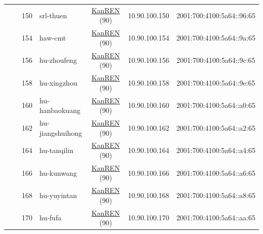 \begin{small}
\begin{center}
\begin{longtable}{|c|c|c|c|c|c|c|c|}
  &  & \tiny{150} & \multicolumn{1}{|l|}{\tiny{srl-thuen}} & \multicolumn{2}{|c|}{\tiny{\href{http://www.kanren.net}{KanREN} (90)}} & \tiny{10.90.100.150} & \tiny{2001:700:4100:5a64::96:65} \\* \cline{3-3}\cline{4-4}\cline{5-5}\cline{6-6}\cline{7-7}\cline{8-8}
  &  & \tiny{154} & \multicolumn{1}{|l|}{\tiny{haw-cmt}} & \multicolumn{2}{|c|}{\tiny{\href{http://www.kanren.net}{KanREN} (90)}} & \tiny{10.90.100.154} & \tiny{2001:700:4100:5a64::9a:65} \\* \cline{3-3}\cline{4-4}\cline{5-5}\cline{6-6}\cline{7-7}\cline{8-8}
  &  & \tiny{156} & \multicolumn{1}{|l|}{\tiny{hu-zhoufeng}} & \multicolumn{2}{|c|}{\tiny{\href{http://www.kanren.net}{KanREN} (90)}} & \tiny{10.90.100.156} & \tiny{2001:700:4100:5a64::9c:65} \\* \cline{3-3}\cline{4-4}\cline{5-5}\cline{6-6}\cline{7-7}\cline{8-8}
  &  & \tiny{158} & \multicolumn{1}{|l|}{\tiny{hu-xingzhou}} & \multicolumn{2}{|c|}{\tiny{\href{http://www.kanren.net}{KanREN} (90)}} & \tiny{10.90.100.158} & \tiny{2001:700:4100:5a64::9e:65} \\* \cline{3-3}\cline{4-4}\cline{5-5}\cline{6-6}\cline{7-7}\cline{8-8}
  &  & \tiny{160} & \multicolumn{1}{|l|}{\tiny{hu-hanbaokuang}} & \multicolumn{2}{|c|}{\tiny{\href{http://www.kanren.net}{KanREN} (90)}} & \tiny{10.90.100.160} & \tiny{2001:700:4100:5a64::a0:65} \\* \cline{3-3}\cline{4-4}\cline{5-5}\cline{6-6}\cline{7-7}\cline{8-8}
  &  & \tiny{162} & \multicolumn{1}{|l|}{\tiny{hu-jiangshuihong}} & \multicolumn{2}{|c|}{\tiny{\href{http://www.kanren.net}{KanREN} (90)}} & \tiny{10.90.100.162} & \tiny{2001:700:4100:5a64::a2:65} \\* \cline{3-3}\cline{4-4}\cline{5-5}\cline{6-6}\cline{7-7}\cline{8-8}
  &  & \tiny{164} & \multicolumn{1}{|l|}{\tiny{hu-tanqilin}} & \multicolumn{2}{|c|}{\tiny{\href{http://www.kanren.net}{KanREN} (90)}} & \tiny{10.90.100.164} & \tiny{2001:700:4100:5a64::a4:65} \\* \cline{3-3}\cline{4-4}\cline{5-5}\cline{6-6}\cline{7-7}\cline{8-8}
  &  & \tiny{166} & \multicolumn{1}{|l|}{\tiny{hu-kunwang}} & \multicolumn{2}{|c|}{\tiny{\href{http://www.kanren.net}{KanREN} (90)}} & \tiny{10.90.100.166} & \tiny{2001:700:4100:5a64::a6:65} \\* \cline{3-3}\cline{4-4}\cline{5-5}\cline{6-6}\cline{7-7}\cline{8-8}
  &  & \tiny{168} & \multicolumn{1}{|l|}{\tiny{hu-yuyintan}} & \multicolumn{2}{|c|}{\tiny{\href{http://www.kanren.net}{KanREN} (90)}} & \tiny{10.90.100.168} & \tiny{2001:700:4100:5a64::a8:65} \\* \cline{3-3}\cline{4-4}\cline{5-5}\cline{6-6}\cline{7-7}\cline{8-8}
  &  & \tiny{170} & \multicolumn{1}{|l|}{\tiny{hu-fufa}} & \multicolumn{2}{|c|}{\tiny{\href{http://www.kanren.net}{KanREN} (90)}} & \tiny{10.90.100.170} & \tiny{2001:700:4100:5a64::aa:65} \\ \hline
\end{longtable}
\end{center}
\end{small}



